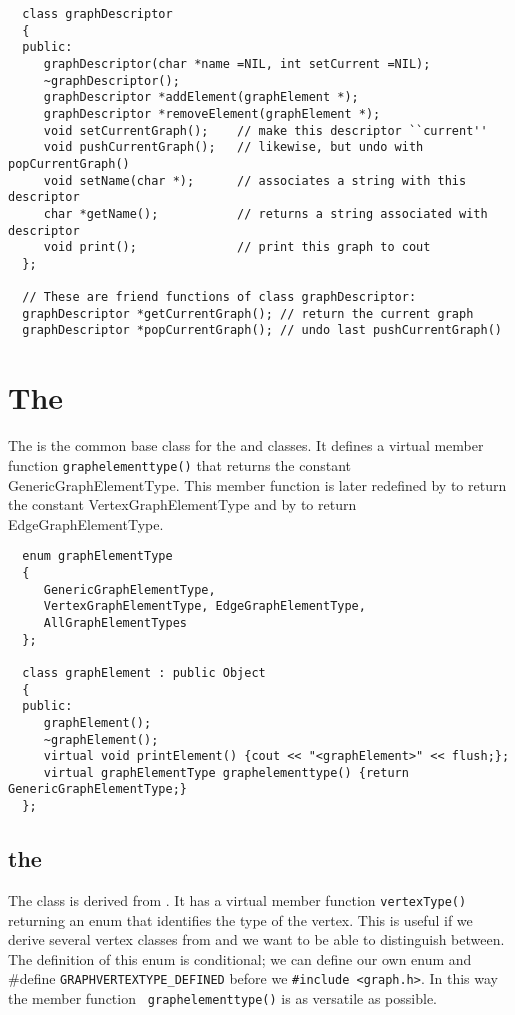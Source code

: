 {\footnotesize \begin{verbatim}
  class graphDescriptor
  {
  public:
     graphDescriptor(char *name =NIL, int setCurrent =NIL);
     ~graphDescriptor();
     graphDescriptor *addElement(graphElement *);
     graphDescriptor *removeElement(graphElement *);
     void setCurrentGraph();    // make this descriptor ``current''
     void pushCurrentGraph();   // likewise, but undo with popCurrentGraph()
     void setName(char *);      // associates a string with this descriptor
     char *getName();           // returns a string associated with descriptor
     void print();              // print this graph to cout
  };
  
  // These are friend functions of class graphDescriptor:
  graphDescriptor *getCurrentGraph(); // return the current graph
  graphDescriptor *popCurrentGraph(); // undo last pushCurrentGraph()
\end{verbatim}}

\section{The }
The  is the common base class for the 
and  classes. It defines a virtual member function
{\tt graphelementtype()} that returns the constant GenericGraphElementType. This
member function is later redefined by  to return the
constant VertexGraphElementType and by  to return
EdgeGraphElementType.

{\footnotesize \begin{verbatim}
  enum graphElementType
  {
     GenericGraphElementType,
     VertexGraphElementType, EdgeGraphElementType,
     AllGraphElementTypes
  };

  class graphElement : public Object
  {
  public:
     graphElement();
     ~graphElement();
     virtual void printElement() {cout << "<graphElement>" << flush;};
     virtual graphElementType graphelementtype() {return GenericGraphElementType;}
  };
\end{verbatim}}

\subsection{the }
The  class is derived from . It has a
virtual member function {\tt vertexType()} returning an enum that
identifies the type of the vertex.  This is useful if we derive several vertex
classes from  and we want to be able to distinguish between.
The definition of this enum is conditional; we can define our own enum
 and \#define {\tt GRAPHVERTEXTYPE\_DEFINED} before we
{\tt \#include <graph.h>}. In this way the member function {\tt
graphelementtype()} is as versatile as possible.

